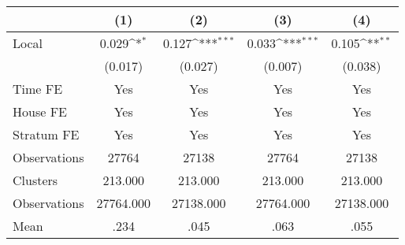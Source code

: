 {
\def\sym#1{\ifmmode^{#1}\else\(^{#1}\)\fi}
\begin{tabular}{l*{4}{c}}
\hline\hline
                &\multicolumn{1}{c}{(1)}         &\multicolumn{1}{c}{(2)}         &\multicolumn{1}{c}{(3)}         &\multicolumn{1}{c}{(4)}         \\
\hline
Local           &    0.029\sym{*}  &    0.127\sym{***}&    0.033\sym{***}&    0.105\sym{**} \\
                &  (0.017)         &  (0.027)         &  (0.007)         &  (0.038)         \\
Time FE         &      Yes         &      Yes         &      Yes         &      Yes         \\
House FE        &      Yes         &      Yes         &      Yes         &      Yes         \\
Stratum FE      &      Yes         &      Yes         &      Yes         &      Yes         \\
\hline
Observations    &    27764         &    27138         &    27764         &    27138         \\
Clusters        &  213.000         &  213.000         &  213.000         &  213.000         \\
Observations    &27764.000         &27138.000         &27764.000         &27138.000         \\
Mean            &     .234         &     .045         &     .063         &     .055         \\
\hline\hline
\end{tabular}
}
